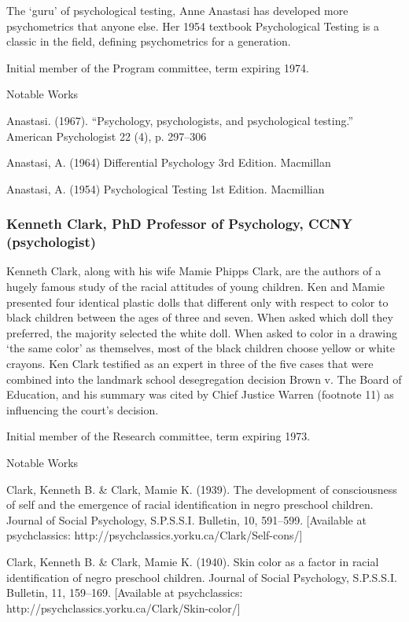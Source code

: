 The `guru' of psychological testing, Anne Anastasi has developed more psychometrics that anyone else. Her 1954 textbook Psychological Testing is a classic in the field, defining psychometrics for a generation.

Initial member of the Program committee, term expiring 1974.

Notable Works

Anastasi. (1967). “Psychology, psychologists, and psychological testing.” American Psychologist 22 (4), p. 297--306

Anastasi, A. (1964) Differential Psychology 3rd Edition. Macmillan

Anastasi, A. (1954) Psychological Testing 1st Edition. Macmillian

\subsubsection{Kenneth Clark, PhD Professor of Psychology, CCNY (psychologist)}
\label{kennethclarkphdprofessorofpsychologyccnypsychologist}

Kenneth Clark, along with his wife Mamie Phipps Clark, are the authors of a hugely famous study of the racial attitudes of young children. Ken and Mamie presented four identical plastic dolls that different only with respect to color to black children between the ages of three and seven. When asked which doll they preferred, the majority selected the white doll. When asked to color in a drawing `the same color' as themselves, most of the black children choose yellow or white crayons. Ken Clark testified as an expert in three of the five cases that were combined into the landmark school desegregation decision Brown v. The Board of Education, and his summary was cited by Chief Justice Warren (footnote 11) as influencing the court's decision.

Initial member of the Research committee, term expiring 1973.

Notable Works

Clark, Kenneth B. \& Clark, Mamie K. (1939). The development of consciousness of self and the emergence of racial identification in negro preschool children. Journal of Social Psychology, S.P.S.S.I. Bulletin, 10, 591--599. [Available at psychclassics: http:\slash \slash psychclassics.yorku.ca\slash Clark\slash Self-cons\slash ]

Clark, Kenneth B. \& Clark, Mamie K. (1940). Skin color as a factor in racial identification of negro preschool children. Journal of Social Psychology, S.P.S.S.I. Bulletin, 11, 159--169. [Available at psychclassics: http:\slash \slash psychclassics.yorku.ca\slash Clark\slash Skin-color\slash ]

